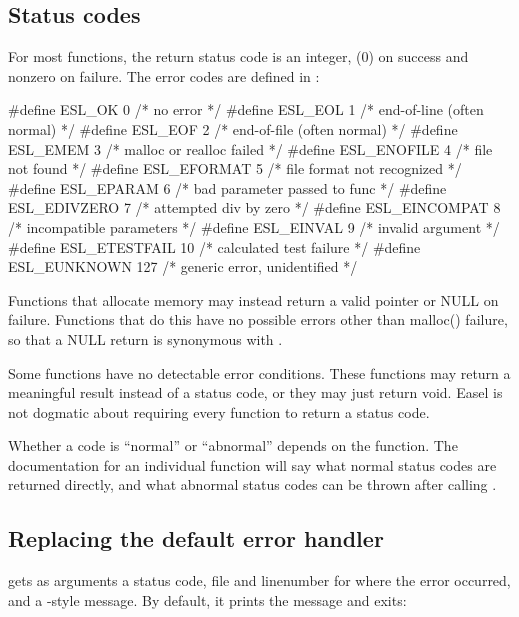 \subsection{Status codes}

For most functions, the return status code is an integer,
 (0) on success and nonzero on failure. The error
codes are defined in :

\begin{cchunk}
#define ESL_OK         0	/* no error                     */
#define ESL_EOL        1	/* end-of-line (often normal)   */
#define ESL_EOF        2	/* end-of-file (often normal)   */
#define ESL_EMEM       3	/* malloc or realloc failed     */
#define ESL_ENOFILE    4	/* file not found               */
#define ESL_EFORMAT    5	/* file format not recognized   */
#define ESL_EPARAM     6	/* bad parameter passed to func */
#define ESL_EDIVZERO   7	/* attempted div by zero        */
#define ESL_EINCOMPAT  8	/* incompatible parameters      */
#define ESL_EINVAL     9	/* invalid argument             */
#define ESL_ETESTFAIL  10	/* calculated test failure      */
#define ESL_EUNKNOWN   127      /* generic error, unidentified  */
\end{cchunk}

Functions that allocate memory may instead return a valid pointer or
NULL on failure. Functions that do this have no possible errors other
than malloc() failure, so that a NULL return is synonymous with
.

Some functions have no detectable error conditions. These functions
may return a meaningful result instead of a status code, or they may
just return void. Easel is not dogmatic about requiring every function
to return a status code.

Whether a code is ``normal'' or ``abnormal'' depends on the function.
The documentation for an individual function will say what normal
status codes are returned directly, and what abnormal status codes can
be thrown after calling .

\subsection{Replacing the default error handler}

 gets as arguments a status code, file and
linenumber for where the error occurred, and a -style
message. By default, it prints the message and exits:

